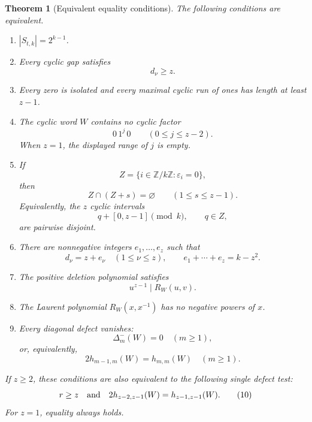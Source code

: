 \documentclass[11pt]{article}
\newtheorem{theorem}{Theorem}[section]
\begin{document}
\begin{theorem}[Equivalent equality conditions]\label{thm:main}
The following conditions are equivalent.

\begin{enumerate}[label=\textup{(\roman*)},ref=\textup{(\roman*)},leftmargin=3em]
\item \label{it:equality}
      $|S_{t,k}|=2^{k-1}$.

\item \label{it:gaps}
      Every cyclic gap satisfies
      \[
                              d_\nu\geq z.
      \]

\item \label{it:runs}
      Every zero is isolated and every maximal cyclic run of ones has
      length at least $z-1$.

\item \label{it:patterns}
      The cyclic word $W$ contains no cyclic factor
      \[
                              0\,1^j\,0
                              \qquad(0\leq j\leq z-2).
      \]
      When $z=1$, the displayed range of $j$ is empty.

\item \label{it:packing}
      If
      \[
            Z=\{i\in\mathbb Z/k\mathbb Z:\varepsilon_i=0\},
      \]
      then
      \[
             Z\cap(Z+s)=\varnothing
             \qquad(1\leq s\leq z-1).                       \tag{6}
      \]
      Equivalently, the $z$ cyclic intervals
      \[
             q+[0,z-1]\pmod k,\qquad q\in Z,
      \]
      are pairwise disjoint.

\item \label{it:composition}
      There are nonnegative integers $e_1,\ldots,e_z$ such that
      \[
             d_\nu=z+e_\nu\quad(1\leq\nu\leq z),
             \qquad
             e_1+\cdots+e_z=k-z^2.                           \tag{7}
      \]

\item \label{it:divisibility}
      The positive deletion polynomial satisfies
      \[
                              u^{z-1}\mid R_W(u,v).           \tag{8}
      \]

\item \label{it:negative}
      The Laurent polynomial $R_W(x,x^{-1})$ has no negative
      powers of $x$.

\item \label{it:defects}
      Every diagonal defect vanishes:
      \[
            \Delta_m^-(W)=0\quad(m\geq1),
      \]
 or, equivalently,
      \[
            2h_{m-1,m}(W)=h_{m,m}(W)\quad(m\geq1).           \tag{9}
      \]
\end{enumerate}

If $z\geq2$, these conditions are also equivalent to the following
single defect test:
\begin{equation}
 r\geq z
 \quad\hbox{and}\quad
 2h_{z-2,z-1}(W)=h_{z-1,z-1}(W).                             \tag{10}
\end{equation}
For $z=1$, equality always holds.
\end{theorem}
\end{document}

